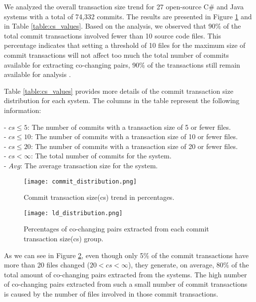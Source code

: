 We analyzed the overall transaction size trend for 27 open-source C\# and Java systems with a total of 74,332 commits. The results are presented in Figure \ref{fig:fig_cs} and in Table \ref{table:cs_values}. Based on the analysis, we observed that 90\% of the total commit transactions involved fewer than 10 source code files. This percentage indicates that setting a threshold of 10 files for the maximum size of commit transactions will not affect too much the total number of commits available for extracting co-changing pairs, 90\% of the transactions still remain available for analysis \cite{DepSACI, enase19}.

Table \ref{table:cs_values} provides more details of the commit transaction size distribution for each system. The columns in the table represent the following information:

\hspace{-4em}- \textit{$cs\leq 5$}: The number of commits with a transaction size of 5 or fewer files. \\
- \textit{$cs\leq 10$}: The number of commits with a transaction size of 10 or fewer files. \\
- \textit{$cs\leq 20$}: The number of commits with a transaction size of 20 or fewer files. \\
- \textit{$cs<\infty$}: The total number of commits for the system. \\
- \textit{$Avg$}: The average transaction size for the system.


\begin{figure}[!h]
\centering
\texttt{[image: commit\_distribution.png]}
\caption{Commit transaction size(cs) trend in percentages.}
\label{fig:fig_cs}
\centering
\end{figure}


\begin{figure}[!h]
\centering
\texttt{[image: ld\_distribution.png]}
\caption{Percentages of co-changing pairs extracted from each commit transaction size(cs) group.}
\label{fig:fig_ld_cs}
\centering
\end{figure}

As we can see in Figure \ref{fig:fig_ld_cs}, even though only 5\% of the commit transactions have more than 20 files changed ($20<cs<\infty$), they generate, on average, 80\% of the total amount of co-changing pairs extracted from the systems.  
The high number of co-changing pairs extracted from such a small number of commit transactions is caused by the number of files involved in those commit transactions.  

